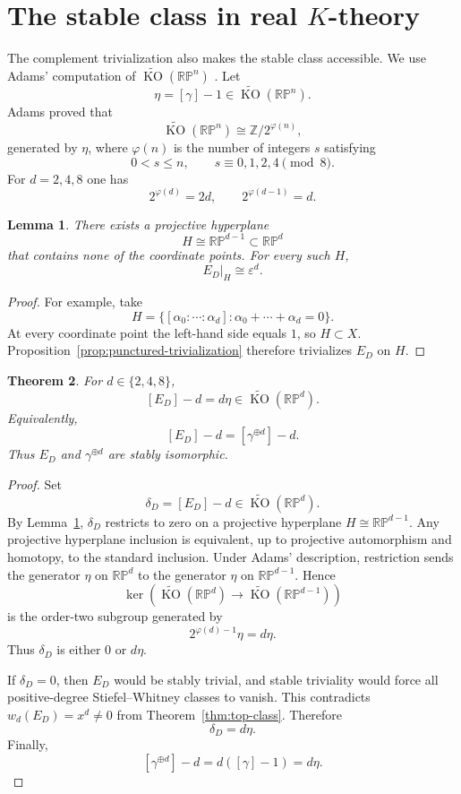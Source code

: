 \documentclass[12pt]{article}
\theoremstyle{plain}
\newtheorem{theorem}{Theorem}[section]
\newtheorem{lemma}[theorem]{Lemma}
\theoremstyle{definition}
\newcommand{\RP}{\mathbb{RP}}
\newcommand{\KO}{\operatorname{KO}}
\begin{document}
\section{The stable class in real $K$-theory}
\label{sec:ko}

The complement trivialization also makes the stable class accessible.
We use Adams' computation of $\widetilde{\KO}(\RP^n)$
\cite{Adams}. Let
\[
\eta=[\gamma]-1\in\widetilde{\KO}(\RP^n).
\]
Adams proved that
\[
\widetilde{\KO}(\RP^n)
\cong\mathbb Z/2^{\varphi(n)},
\]
generated by $\eta$, where $\varphi(n)$ is the number of integers
$s$ satisfying
\[
0<s\le n,
\qquad
s\equiv0,1,2,4\pmod8.
\]
For $d=2,4,8$ one has
\[
2^{\varphi(d)}=2d,
\qquad
2^{\varphi(d-1)}=d.
\]

\begin{lemma}
	\label{lem:generic-hyperplane}
	There exists a projective hyperplane
	\[
	H\cong\RP^{d-1}\subset\RP^d
	\]
	that contains none of the coordinate points. For every such $H$,
	\[
	E_D|_H\cong\varepsilon^d.
	\]
\end{lemma}

\begin{proof}
	For example, take
	\[
	H=\{[\alpha_0:\cdots:\alpha_d]:
	\alpha_0+\cdots+\alpha_d=0\}.
	\]
	At every coordinate point the left-hand side equals $1$, so
	$H\subset X$. Proposition~\ref{prop:punctured-trivialization} therefore
	trivializes $E_D$ on $H$.
\end{proof}

\begin{theorem}
	\label{thm:ko-class}
	For $d\in\{2,4,8\}$,
	\[
	[E_D]-d=d\eta
	\in\widetilde{\KO}(\RP^d).
	\]
	Equivalently,
	\[
	[E_D]-d=[\gamma^{\oplus d}]-d.
	\]
	Thus $E_D$ and $\gamma^{\oplus d}$ are stably isomorphic.
\end{theorem}

\begin{proof}
	Set
	\[
	\delta_D=[E_D]-d\in\widetilde{\KO}(\RP^d).
	\]
	By Lemma~\ref{lem:generic-hyperplane}, $\delta_D$ restricts to zero on
	a projective hyperplane $H\cong\RP^{d-1}$. Any projective hyperplane
	inclusion is equivalent, up to projective automorphism and homotopy, to
	the standard inclusion. Under Adams' description, restriction sends
	the generator $\eta$ on $\RP^d$ to the generator $\eta$ on
	$\RP^{d-1}$. Hence
	\[
	\ker\!\left(
	\widetilde{\KO}(\RP^d)
	\longrightarrow
	\widetilde{\KO}(\RP^{d-1})
	\right)
	\]
	is the order-two subgroup generated by
	\[
	2^{\varphi(d)-1}\eta=d\eta.
	\]
	Thus $\delta_D$ is either $0$ or $d\eta$.
	
	If $\delta_D=0$, then $E_D$ would be stably trivial, and stable
	triviality would force all positive-degree Stiefel--Whitney classes to
	vanish. This contradicts
	$w_d(E_D)=x^d\ne0$ from Theorem~\ref{thm:top-class}. Therefore
	\[
	\delta_D=d\eta.
	\]
	Finally,
	\[
	[\gamma^{\oplus d}]-d=d([\gamma]-1)=d\eta.
	\]
\end{proof}
\end{document}

